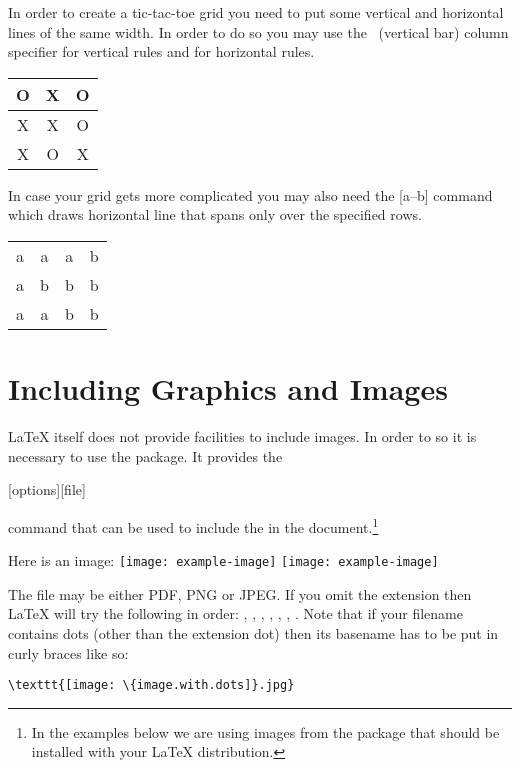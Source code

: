In order to create a tic-tac-toe grid you need to put some vertical and
horizontal lines of the same width. In order to do so you may use the
\cargv{|}~(vertical bar) column specifier for vertical rules and  for
horizontal rules.
\begin{chktexignore}
  \begin{example}
\begin{tabular}{c|c|c}
  O & X & O \\
  \hline
  X & X & O \\
  \hline
  X & O & X \\
\end{tabular}
\end{example}
\end{chktexignore}
In case your grid gets more complicated you may also need the [a--b] %
command which draws horizontal line that spans only over the specified rows.
\begin{chktexignore}
  \begin{example}[examplewidth=0.4\linewidth]
\begin{tabular}{|cccc|}
  \cline{4-4}
  a & a & \multicolumn{1}{c|}{a} & b \\
  \cline{2-3}
  a & \multicolumn{1}{|c}{b} & b & b \\
  \cline{2-2}
  a & a & \multicolumn{1}{|c}{b} & b \\
  \cline{1-2}
\end{tabular}
\end{example}
\end{chktexignore}

\section{Including Graphics and Images}\label{sec:images}

\LaTeX{} itself does not provide facilities to include images. In order to so
it is necessary to use the  package. It provides the
\begin{lscommand}
  [options][file]
\end{lscommand}
command that can be used to include the  in the
document.\footnote{In the examples below we are using images from the
   package that should be installed with your \LaTeX{} distribution.}
\begin{example}
Here is an image:
\texttt{[image: example-image]}
\texttt{[image: example-image]}%
\end{example}
The file may be either PDF, PNG or JPEG\@. If you omit the extension then
\LaTeX{} will try the following in order: , , ,
, , , . Note that if your filename
contains dots (other than the extension dot) then its basename has to be put in
curly braces like so:
\begin{code}
  \verb|\texttt{[image: \{image.with.dots]}.jpg}|
\end{code}

